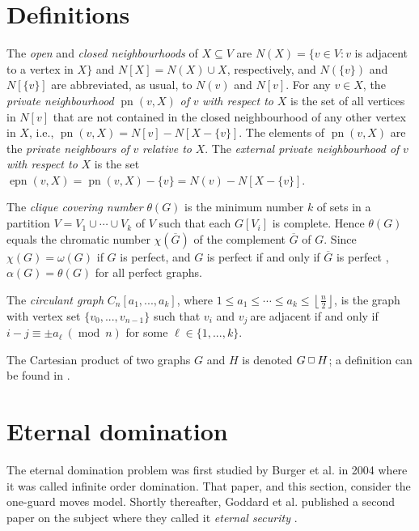 \documentclass[12pt]{article}%
\providecommand{\boksie}{\ensuremath{\mathbin{\raisebox{0.3mm}{$\scriptstyle\square$}}}}
\begin{document}
\section{Definitions}

The \emph{open} and \emph{closed neighbourhoods} of $X\subseteq V$ are
$N(X)=\{v\in V:v$ is adjacent to a vertex in $X\}$ and $N[X]=N(X)\cup X$,
respectively, and $N(\{v\})$ and $N[\{v\}]$ are abbreviated, as usual, to
$N(v)$ and $N[v]$. For any $v\in X$, the \emph{private neighbourhood}
$\operatorname{pn}(v,X)$\emph{ of }$v$\emph{ with respect to }$X$ is the set
of all vertices in $N[v]$ that are not contained in the closed neighbourhood
of any other vertex in $X$, i.e., $\operatorname{pn}(v,X)=N[v]-N[X-\{v\}]$.
The elements of $\operatorname{pn}(v,X)$ are the \emph{private neighbours of
}$v$ \emph{relative to }$X$. The \emph{external private neighbourhood of }$v$
\emph{with respect to }$X$ is the set $\operatorname{epn}%
(v,X)=\operatorname{pn}(v,X)-\{v\}=N(v)-N[X-\{v\}]$.

The \emph{clique covering number }$\theta(G)$ is the minimum number $k$ of
sets in a partition $V=V_{1}\cup\cdots\cup V_{k}$ of $V$ such that each
$G[V_{i}]$ is complete. Hence $\theta(G)$ equals the chromatic number
$\chi(\overline{G})$ of the complement $\overline{G}$ of $G$. Since
$\chi(G)=\omega(G)$ if $G$ is perfect, and $G$ is perfect if and only if
$\overline{G}$ is perfect \cite[p. 203]{CL}, $\alpha(G)=\theta(G)$ for all
perfect graphs.

The \emph{circulant graph} $C_{n}[a_{1},...,a_{k}]$, where $1\leq a_{1}%
\leq\cdots\leq a_{k}\leq\left\lfloor \frac{n}{2}\right\rfloor $, is the graph
with vertex set $\{v_{0},...,v_{n-1}\}$ such that $v_{i}$ and $v_{j}\ $are
adjacent if and only if $i-j\equiv\pm a_{\ell}\ (\operatorname{mod}\ n)$ for
some $\ell\in\{1,...,k\}$.

The Cartesian product of two graphs $G$ and $H$ is denoted $G\boksie H$; a
definition can be found in \cite{HHS}.

\section{Eternal domination}

\label{Sec_ED} The eternal domination problem was first studied by Burger et
al. \cite{BCG2} in 2004 where it was called infinite order domination. That
paper, and this section, consider the one-guard moves model. Shortly
thereafter, Goddard et al. published a second paper on the subject where they
called it \emph{eternal security} \cite{GHH}.
\end{document}
